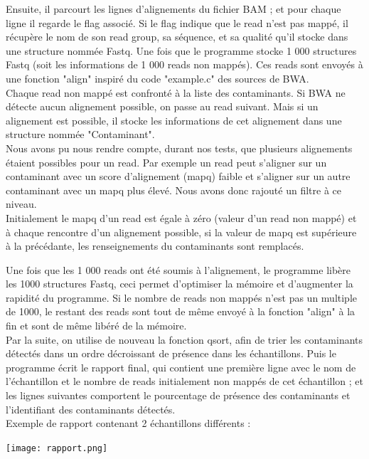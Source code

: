 \documentclass[a4paper,12pt]{article}
\begin{document}
Ensuite, il parcourt les lignes d'alignements du fichier BAM ; et pour chaque ligne il regarde le flag associé. Si le flag indique que le read n'est pas mappé, il récupère le nom de son read group, sa séquence, et sa qualité qu'il stocke dans une structure nommée Fastq. Une fois que le programme stocke 1 000 structures Fastq (soit les informations de 1 000 reads non mappés). Ces reads sont envoyés à une fonction "align" inspiré du code "example.c" des sources de BWA. \\
Chaque read non mappé est confronté à la liste des contaminants. Si BWA ne détecte aucun alignement possible, on passe au read suivant. Mais si un alignement est possible, il stocke les informations de cet alignement dans une structure nommée "Contaminant". \\ 
Nous avons pu nous rendre compte, durant nos tests, que plusieurs alignements étaient possibles pour un read. Par exemple un read peut s'aligner sur un contaminant avec un score d'alignement (mapq) faible et s'aligner sur un autre contaminant avec un mapq plus élevé. Nous avons donc rajouté un filtre à ce niveau. \\
Initialement le mapq d'un read est égale à zéro (valeur d'un read non mappé) et à chaque rencontre d'un alignement possible, si la valeur de mapq est supérieure à la précédante, les renseignements du contaminants sont remplacés. 

Une fois que les 1 000 reads ont été soumis à l'alignement, le programme libère les 1000 structures Fastq, ceci permet d'optimiser la mémoire et d'augmenter la rapidité du programme. Si le nombre de reads non mappés n'est pas un multiple de 1000, le restant des reads sont tout de même envoyé à la fonction "align" à la fin et sont de même libéré de la mémoire. \\


Par la suite, on utilise de nouveau la fonction qsort, afin de trier les contaminants détectés dans un ordre décroissant de présence dans les échantillons. Puis le programme écrit le rapport final, qui contient une première ligne avec le nom de l'échantillon et le nombre de reads initialement non mappés de cet échantillon ; et les lignes suivantes comportent le pourcentage de présence des contaminants et l'identifiant des contaminants détectés.\\

Exemple de rapport contenant 2 échantillons différents :  \begin{center}
 \texttt{[image: rapport.png]}~\\ \end{center}
 
\end{document}
